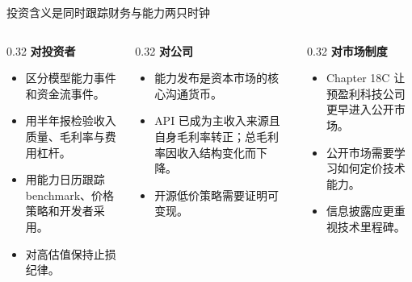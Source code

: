 \documentclass[aspectratio=169,11pt]{beamer}
\begin{document}
\begin{frame}{投资含义是同时跟踪财务与能力两只时钟}
  \begin{columns}[T,onlytextwidth]
    \begin{column}{0.32\textwidth}
      \textbf{对投资者}
      \begin{itemize}
        \item 区分模型能力事件和资金流事件。
        \item 用半年报检验收入质量、毛利率与费用杠杆。
        \item 用能力日历跟踪 benchmark、价格策略和开发者采用。
        \item 对高估值保持止损纪律。
      \end{itemize}
    \end{column}
    \begin{column}{0.32\textwidth}
      \textbf{对公司}
      \begin{itemize}
        \item 能力发布是资本市场的核心沟通货币。
        \item API 已成为主收入来源且自身毛利率转正；总毛利率因收入结构变化而下降。
        \item 开源低价策略需要证明可变现。
      \end{itemize}
    \end{column}
    \begin{column}{0.32\textwidth}
      \textbf{对市场制度}
      \begin{itemize}
        \item Chapter 18C 让预盈利科技公司更早进入公开市场。
        \item 公开市场需要学习如何定价技术能力。
        \item 信息披露应更重视技术里程碑。
      \end{itemize}
    \end{column}
  \end{columns}
\end{frame}
\end{document}
